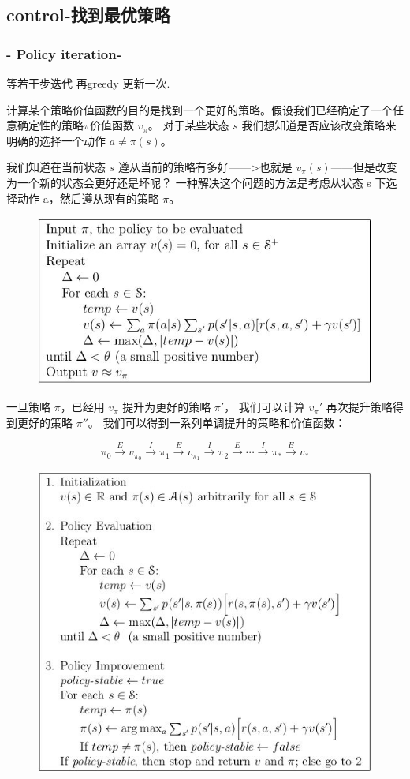\documentclass[UTF8,a4paper,12pt]{ctexbook}
\begin{document}
		\subsection{control-找到最优策略}
			\subsubsection{ - Policy iteration- }
				等若干步迭代 再greedy 更新一次.
				
				计算某个策略价值函数的目的是找到一个更好的策略。假设我们已经确定了一个任意确定性的策略$\pi$价值函数 $v_\pi$。 对于某些状态 $s$ 我们想知道是否应该改变策略来明确的选择一个动作 $a ≠ \pi(s)$。 
				
				我们知道在当前状态 $s$ 遵从当前的策略有多好——>也就是 $v_\pi(s)$——但是改变为一个新的状态会更好还是坏呢？ 一种解决这个问题的方法是考虑从状态 s 下选择动作 a，然后遵从现有的策略 $\pi$。
			
				
				\begin{figure}[H]
					\centering
					\includegraphics[width=.75\linewidth]{dp00}
				\end{figure}
			

				一旦策略 $\pi$，已经用 $v_\pi$ 提升为更好的策略 $\pi'$， 我们可以计算 $v_\pi'$ 再次提升策略得到更好的策略 $\pi''$。 我们可以得到一系列单调提升的策略和价值函数：
				
				$$ \pi_0 \overset{E}{\rightarrow} v_{\pi_0} \overset{I}{\rightarrow} \pi_1 \overset{E}{\rightarrow} v_{\pi_1} \overset{I}{\rightarrow} \pi_2 \overset{E}{\rightarrow} \cdots \overset{I}{\rightarrow} \pi_* \overset{E}{\rightarrow} v_{*} $$
				
			
				\begin{figure}[H]
					\centering
					\includegraphics[width=.75\linewidth]{dp01}
				\end{figure}			
			
\end{document}
